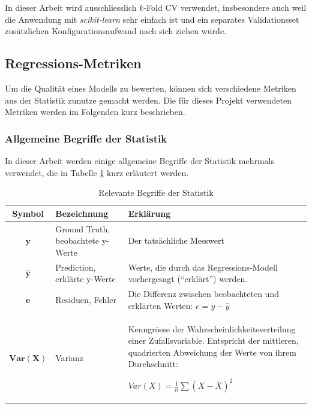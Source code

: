 \documentclass[10pt, a4paper]{article}
\begin{document}
In dieser Arbeit wird ausschliesslich \(k\)-Fold \ac{CV} verwendet, insbesondere auch weil die Anwendung mit \emph{scikit-learn} sehr einfach ist und ein separates Validationsset zusätzlichen Konfigurationsaufwand nach sich ziehen würde.

\subsection{Regressions-Metriken} \label{sec:regressionmetrics}
Um die Qualität eines Modells zu bewerten, können sich verschiedene Metriken aus der Statistik zunutze gemacht werden. Die für dieses Projekt verwendeten Metriken werden im Folgenden kurz beschrieben.

\subsubsection{Allgemeine Begriffe der Statistik}
In dieser Arbeit werden einige allgemeine Begriffe der Statistik mehrmals verwendet, die in Tabelle \ref{statisticwords} kurz erläutert werden.

\begin{table}
	\centering
	\begin{tabularx}{\textwidth}[!ht]{| c | X | X |}
		\hline
		\textbf{Symbol} & 
		\textbf{Bezeichnung} & 
		\textbf{Erklärung} \\
		\hline
		\(\mathbf{y}\) &
		Ground Truth, beobachtete y-Werte &
		Der tatsächliche Messwert \\
		\hline
		\(\mathbf{\hat{y}}\) &
		Prediction, erklärte y-Werte &
		Werte, die durch das Regressions-Modell vorhergesagt (``erklärt'') werden. \\
		\hline
		\(\mathbf{e}\) &
		Residuen, Fehler &
		Die Differenz zwischen beobachteten und erklärten Werten: \(e = y - \hat{y}\)\\
		\hline
		\(\mathbf{Var(X)}\) &
		Varianz &
		Kenngrösse der Wahrscheinlichkeitsverteilung einer Zufallsvariable. Entspricht der mittleren, quadrierten Abweichung der Werte von ihrem Durchschnitt:
		
		\(Var(X) = \frac{1}{n} \sum (X - \bar{X})^2\)\\
		\hline
	\end{tabularx}
	\caption{Relevante Begriffe der Statistik}
	\label{statisticwords}
\end{table}
\end{document}
